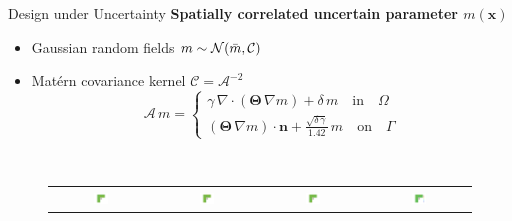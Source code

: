 \documentclass[10pt,xcolor=dvipsnames,compress]{beamer}
\begin{document}
\begin{frame}{Design under Uncertainty}
\footnotesize
    \textbf{Spatially correlated uncertain parameter $m(\mathbf{x})$}
    \begin{itemize}
        \item Gaussian random fields $m \sim \mathcal{N}(\Bar{m},\mathcal{C})$
        \item Mat\'ern covariance kernel $\mathcal{C}=\mathcal{A}^{-2}$
        \begin{equation*}
        \mathcal{A} \, m = \begin{cases}
            \gamma \, \nabla \cdot( \boldsymbol{\Theta} \,\nabla m ) + \delta \, m  \quad\mathrm{in}\quad\Omega
                    \\
            (\boldsymbol{\Theta}\,\nabla m) \cdot \mathbf{n}  + \frac{\sqrt{\delta\,\gamma}}{1.42}\,m  \quad\mathrm{on}\quad\Gamma
        \end{cases}
    \end{equation*}
        \scriptsize
    \end{itemize}
    \begin{figure}[!htb]
\centering
\vspace{-0.05in}\\
\begin{tabular}{c c c c}
\includegraphics[trim={3.5in 2in 3.5in 2in},clip,width=0.16\textwidth]{Figures/low_1.png} &
\includegraphics[trim={3.5in 2in 3.5in 2in},clip,width=0.16\textwidth]{Figures/low_2.png} &
\includegraphics[trim={3.5in 2in 3.5in 2in},clip,width=0.16\textwidth]{Figures/low_3.png} &
\includegraphics[trim={3.5in 2in 3.5in 2in},clip,width=0.16\textwidth]{Figures/low_4.png} 
 \end{tabular}

\end{figure}
\end{frame}
\end{document}
